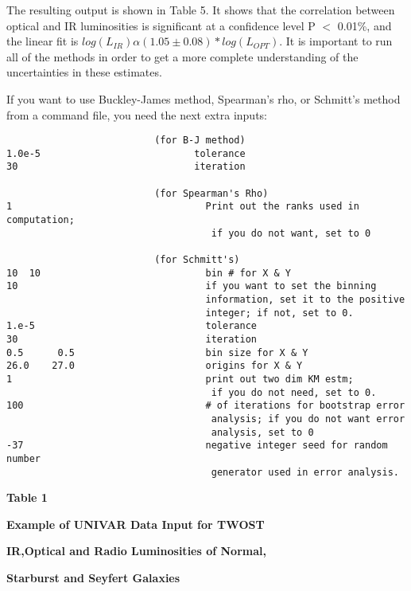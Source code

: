      The resulting output is shown in Table 5. It shows that the
correlation between optical and IR luminosities is significant at a
confidence level P $<$ 0.01\%, and the linear fit  is 
$log(L_{IR})\alpha(1.05 \pm 0.08)*log(L_{OPT})$. It is important to run all 
of the methods in order to get a more complete understanding of the 
uncertainties in these estimates.

      If you want to use Buckley-James method, Spearman's rho, or Schmitt's 
method from a command file, you need the next extra inputs:

\begin{verbatim}
                          (for B-J method)
1.0e-5                           tolerance
30                               iteration

                          (for Spearman's Rho)
1                                  Print out the ranks used in computation;
                                    if you do not want, set to 0  

                          (for Schmitt's)
10  10                             bin # for X & Y
10                                 if you want to set the binning
                                   information, set it to the positive
                                   integer; if not, set to 0.
1.e-5                              tolerance
30                                 iteration
0.5      0.5                       bin size for X & Y
26.0    27.0                       origins for X & Y
1                                  print out two dim KM estm;
                                    if you do not need, set to 0.
100                                # of iterations for bootstrap error 
                                    analysis; if you do not want error 
                                    analysis, set to 0
-37                                negative integer seed for random number
                                    generator used in error analysis.
\end{verbatim}
\newpage

\centerline{\Large\bf Table 1}

\bigskip
\bigskip

\centerline{\large\bf Example of UNIVAR Data Input for TWOST}

\bigskip

\centerline{\large\bf IR,Optical and Radio Luminosities of Normal,}
\centerline{\large\bf  Starburst and Seyfert Galaxies}

